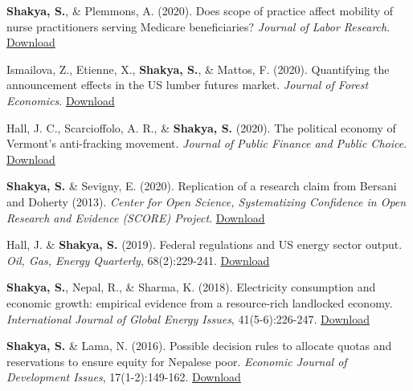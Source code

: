 \begin{etaremune}
\item \textbf{Shakya, S.}, \& Plemmons, A. (2020). Does scope of practice affect mobility of nurse practitioners serving Medicare beneficiaries? \textit{Journal of Labor Research}. \hfill \href{https://www.dropbox.com/scl/fi/va11jwf56xhnqmwdi985j/Does-Scope-of-Practice-Affect-Mobility-of-Nurse-Practitioners-Serving-Medicare-Beneficiaries.pdf?rlkey=htja0s8nr7ifete5a7jy5f3r4&dl=0}{Download}

\item Ismailova, Z., Etienne, X., \textbf{Shakya, S.}, \& Mattos, F. (2020). Quantifying the announcement effects in the US lumber futures market. \textit{Journal of Forest Economics}. \hfill \href{https://www.dropbox.com/scl/fi/guc5orscxfxccvng62u7n/Quantifying-The-Announcement-Effects-In-The-U.S.-Lumber-Market.pdf?rlkey=m26fvg1j27xxtrv4zyzcareck&dl=0}{Download}

\item Hall, J. C., Scarcioffolo, A. R., \& \textbf{Shakya, S.} (2020). The political economy of Vermont's anti-fracking movement. \textit{Journal of Public Finance and Public Choice}. \hfill \href{https://www.dropbox.com/scl/fi/xoxrp260dapkl450x60an/The-Political-Economy-of-Vermont-s-Anti-fracking.pdf?rlkey=vpf8i84sj0s3y4a66d3qsa8lb&dl=0}{Download}

\item \textbf{Shakya, S.} \& Sevigny, E. (2020). Replication of a research claim from Bersani and Doherty (2013). \textit{Center for Open Science, Systematizing Confidence in Open Research and Evidence (SCORE) Project}. \hfill \href{https://osf.io/9bme4}{Download}

\item Hall, J. \& \textbf{Shakya, S.} (2019). Federal regulations and US energy sector output. \textit{Oil, Gas, Energy Quarterly}, 68(2):229-241. \hfill \href{https://www.dropbox.com/scl/fi/evx1qev6p272vi87ogv3p/Federal-Regulations-and-U.S.-Energy-Sector-Output.pdf?rlkey=ewrftnbawujwqsaiqqvhko9m7&dl=0}{Download}

\item \textbf{Shakya, S.}, Nepal, R., \& Sharma, K. (2018). Electricity consumption and economic growth: empirical evidence from a resource-rich landlocked economy. \textit{International Journal of Global Energy Issues}, 41(5-6):226-247. \hfill \href{https://www.inderscience.com/offers.php?id=97139}{Download}

\item \textbf{Shakya, S.} \& Lama, N. (2016). Possible decision rules to allocate quotas and reservations to ensure equity for Nepalese poor. \textit{Economic Journal of Development Issues}, 17(1-2):149-162. \hfill \href{https://www.dropbox.com/scl/fi/bex13j7asy4007n51h3ex/11801.pdf?rlkey=56d65l8c3aw93ehwcw3z98f4c&dl=0}{Download}

\end{etaremune}

